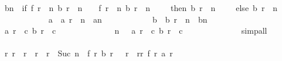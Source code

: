 \begin{isabellebody}
\ {\isacharquery}bn\ {\isacharequal}\ {\isachardoublequoteopen}if\ f\ {\isacharparenleft}r{}\ {\isacharplus}\ n{\isacharparenright}\ {\isacharparenleft}b\ {\isacharparenleft}r{}\ {\isacharplus}\ n\ {\isacharminus}\ {}{\isacharparenright}{\isacharparenright}\ {\isacharless}\ f\ {\isacharparenleft}r{}\ {\isacharplus}\ n{\isacharparenright}\ {\isacharparenleft}b\ {\isacharparenleft}r{}\ {\isacharplus}\ n\ {\isacharminus}\ {}{\isacharparenright}\ {\isacharplus}\ {}{\isacharparenright}\ then\ b\ {\isacharparenleft}r{}\ {\isacharplus}\ n\ {\isacharminus}\ {}{\isacharparenright}\ {\isacharplus}\ {}\ else\ b\ {\isacharparenleft}r{}\ {\isacharplus}\ n\ {\isacharminus}\ {}{\isacharparenright}{\isachardoublequoteclose}\isanewline
\ \ \ \ \ \ \ \ \ \ \isamarkupfalse%
\ {\isacharquery}a\ {\isacharequal}\ {\isachardoublequoteopen}a\ {\isacharparenleft}r{}\ {\isacharplus}\ n\ {\isacharcolon}{\isacharequal}\ {\isacharquery}an{\isacharparenright}{\isachardoublequoteclose}\isanewline
\ \ \ \ \ \ \ \ \ \ \isamarkupfalse%
\ {\isacharquery}b\ {\isacharequal}\ {\isachardoublequoteopen}b\ {\isacharparenleft}r{}\ {\isacharplus}\ n\ {\isacharcolon}{\isacharequal}\ {\isacharquery}bn{\isacharparenright}{\isachardoublequoteclose}\isanewline
\isanewline
\ \ \ \ \ \ \ \ \ \ \isamarkupfalse%
\ {\isachardoublequoteopen}{\isacharquery}a\ r{}\ {\isacharequal}\ c{}{\isachardoublequoteclose}\ {\isachardoublequoteopen}{\isacharquery}b\ r{}\ {\isacharequal}\ c{}{\isachardoublequoteclose}\isanewline
\ \ \ \ \ \ \ \ \ \ \ \ \isamarkupfalse%
\ {\isacharbackquoteopen}n\ {\isasymnoteq}\ {}{\isacharbackquoteclose}\ {\isacharbackquoteopen}a\ r{}\ {\isacharequal}\ c{}{\isacharbackquoteclose}\ {\isacharbackquoteopen}b\ r{}\ {\isacharequal}\ c{}{\isacharbackquoteclose}\isanewline
\ \ \ \ \ \ \ \ \ \ \ \ \isamarkupfalse%
\ simp{\isacharunderscore}all\isanewline
\ \ \ \ \ \ \ \ \ \ \ \ \isanewline
\ \ \ \ \ \ \ \ \ \ \isamarkupfalse%
\isanewline
\isanewline
\ \ \ \ \ \ \ \ \ \ \isamarkupfalse%
\ {\isachardoublequoteopen}{\isasymforall}r{\isachardot}\ r{}\ {\isasymle}\ r\ {\isasymand}\ r\ {\isacharless}\ r{}\ {\isacharplus}\ Suc\ n\ {\isasymlongrightarrow}\ f\ r\ {\isacharparenleft}{\isacharquery}b\ r{\isacharparenright}\ {\isacharequal}\ {\isacharparenleft}{\isasymSum}\ r{\isacharprime}\ {\isasymleftarrow}\ {\isacharbrackleft}r{}{\isachardot}{\isachardot}{\isacharless}r{\isacharplus}{}{\isacharbrackright}{\isachardot}\ f\ r{\isacharprime}\ {\isacharparenleft}{\isacharquery}a\ r{\isacharprime}{\isacharparenright}{\isacharparenright}{\isachardoublequoteclose}\isanewline

\end{isabellebody}
